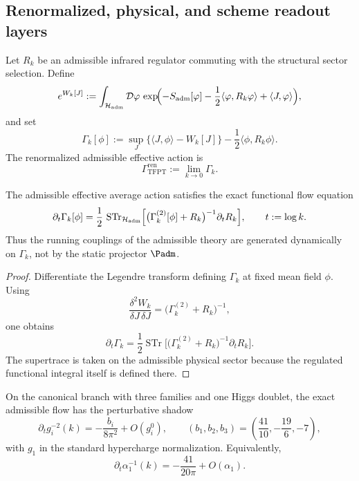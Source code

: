 \subsection{Renormalized, physical, and scheme readout layers}

\begin{definition}
\label{def:admissible-effective-average-action}
Let $R_k$ be an admissible infrared regulator commuting with the structural sector selection.
Define
\[
e^{W_k[J]}
:=
\int_{\mathcal H_{\mathrm{adm}}}\mathcal D\varphi\,
\exp\!\Bigl(
-S_{\mathrm{adm}}[\varphi]
-\frac12\langle \varphi,R_k\varphi\rangle
+\langle J,\varphi\rangle
\Bigr),
\]
and set
\[
\Gamma_k[\phi]
:=
\sup_J\{\langle J,\phi\rangle-W_k[J]\}
-\frac12\langle \phi,R_k\phi\rangle.
\]
The renormalized admissible effective action is
\[
\Gamma_{\mathrm{TFPT}}^{\mathrm{ren}}:=\lim_{k\to0}\Gamma_k.
\]
\end{definition}

\begin{theorem}
\label{thm:exact-admissible-rg-flow}
The admissible effective average action satisfies the exact functional flow equation
\[
\partial_t \Gamma_k[\phi]
=
\frac12\,
\operatorname{STr}_{\mathcal H_{\mathrm{adm}}}
\Bigl[
\bigl(\Gamma_k^{(2)}[\phi]+R_k\bigr)^{-1}
\partial_t R_k
\Bigr],
\qquad
t:=\log k.
\]
Thus the running couplings of the admissible theory are generated dynamically on $\Gamma_k$, not by
the static projector $\Padm$.
\end{theorem}

\begin{proof}
Differentiate the Legendre transform defining $\Gamma_k$ at fixed mean field $\phi$. Using
\[
\frac{\delta^2 W_k}{\delta J\,\delta J}
=
\bigl(\Gamma_k^{(2)}+R_k\bigr)^{-1},
\]
one obtains
\[
\partial_t \Gamma_k
=
\frac12 \operatorname{STr}
\bigl[
\bigl(\Gamma_k^{(2)}+R_k\bigr)^{-1}\partial_t R_k
\bigr].
\]
The supertrace is taken on the admissible physical sector because the regulated functional integral
itself is defined there.
\end{proof}

\begin{corollary}
\label{cor:one-loop-shadow-exact-flow}
On the canonical branch with three families and one Higgs doublet, the exact admissible flow has
the perturbative shadow
\[
\partial_t g_i^{-2}(k)=-\frac{b_i}{8\pi^2}+O(g_i^0),
\qquad
(b_1,b_2,b_3)=\left(\frac{41}{10},-\frac{19}{6},-7\right),
\]
with $g_1$ in the standard hypercharge normalization. Equivalently,
\[
\partial_t \alpha_1^{-1}(k)=-\frac{41}{20\pi}+O(\alpha_1).
\]
\end{corollary}

